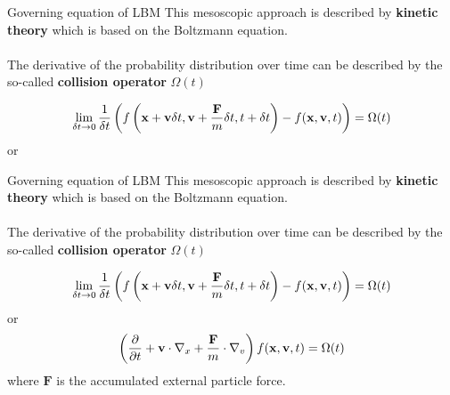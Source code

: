 \documentclass[9pt]{beamer}
\begin{document}
\begin{frame}[t]{Governing equation of LBM}
This mesoscopic approach is described by \textbf{kinetic theory} which is based on the Boltzmann equation. \\~\\
The derivative of the probability distribution over time can be described by the so-called \textbf{collision operator} $\Omega(t)$

\begin{equation*}
\lim_{\delta t \to 0} \frac{1}{\delta t}\left( f\left({\bf x} + {\bf v}\delta t, {\bf v} + \frac{\bf F}{m}\delta t, t + \delta t\right) -f({\bf x}, {\bf v}, t) \right) = \Omega(t)
\end{equation*}
or
\end{frame}

\begin{frame}[t]{Governing equation of LBM}
This mesoscopic approach is described by \textbf{kinetic theory} which is based on the Boltzmann equation. \\~\\
The derivative of the probability distribution over time can be described by the so-called \textbf{collision operator} $\Omega(t)$

\begin{equation*}
\lim_{\delta t \to 0} \frac{1}{\delta t}\left( f\left({\bf x} + {\bf v}\delta t, {\bf v} + \frac{\bf F}{m}\delta t, t + \delta t\right) -f({\bf x}, {\bf v}, t) \right) = \Omega(t)
\end{equation*}
or
\begin{equation*}
\left( \frac{\partial}{\partial t}
      + {\bf v}\cdot\nabla_x
      + \frac{\bf F}{m}\cdot\nabla_v \right)f({\bf x}, {\bf v}, t) = \Omega(t)
\end{equation*}
where $\textbf{F}$ is the accumulated external particle force.
\end{frame}
\end{document}
